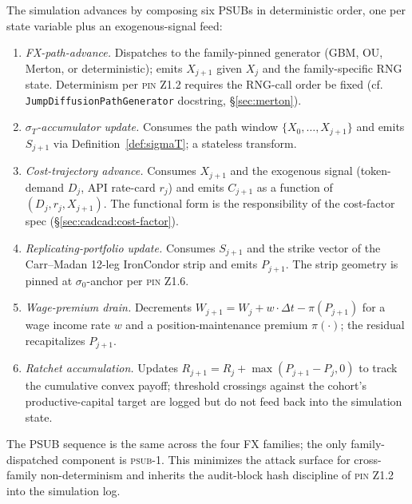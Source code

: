 \documentclass[11pt,letterpaper]{article}
\newcommand{\sigmaT}{\sigma_{T}}
\newcommand{\PinZ}[1]{\textsc{pin Z1.#1}}
\begin{document}
The simulation advances by composing six PSUBs in deterministic order,
one per state variable plus an exogenous-signal feed:

\begin{enumerate}
    \item[(\textsc{psub-1})] \emph{FX-path-advance.} Dispatches to the
        family-pinned generator (GBM, OU, Merton, or deterministic);
        emits $X_{j+1}$ given $X_{j}$ and the family-specific RNG state.
        Determinism per \PinZ{2} requires the RNG-call order be fixed
        (cf. \texttt{JumpDiffusionPathGenerator} docstring, \S\ref{sec:merton}).
    \item[(\textsc{psub-2})] \emph{$\sigmaT$-accumulator update.}
        Consumes the path window $\{X_{0}, \dots, X_{j+1}\}$ and emits
        $S_{j+1}$ via Definition~\ref{def:sigmaT}; a stateless transform.
    \item[(\textsc{psub-3})] \emph{Cost-trajectory advance.} Consumes
        $X_{j+1}$ and the exogenous signal (token-demand $D_{j}$, API
        rate-card $r_{j}$) and emits $C_{j+1}$ as a function of
        $(D_{j}, r_{j}, X_{j+1})$. The functional form is the
        responsibility of the cost-factor spec (\S\ref{sec:cadcad:cost-factor}).
    \item[(\textsc{psub-4})] \emph{Replicating-portfolio update.}
        Consumes $S_{j+1}$ and the strike vector of the Carr--Madan
        12-leg IronCondor strip and emits $P_{j+1}$. The strip
        geometry is pinned at $\sigma_{0}$-anchor per \PinZ{6}.
    \item[(\textsc{psub-5})] \emph{Wage-premium drain.} Decrements
        $W_{j+1} = W_{j} + w \cdot \Delta t - \pi(P_{j+1})$ for a wage
        income rate $w$ and a position-maintenance premium $\pi(\cdot)$;
        the residual recapitalizes $P_{j+1}$.
    \item[(\textsc{psub-6})] \emph{Ratchet accumulation.} Updates
        $R_{j+1} = R_{j} + \max(P_{j+1} - P_{j}, 0)$ to track the
        cumulative convex payoff; threshold crossings against the
        cohort's productive-capital target are logged but do not
        feed back into the simulation state.
\end{enumerate}

The PSUB sequence is the same across the four FX families; the only
family-dispatched component is \textsc{psub-1}. This minimizes the
attack surface for cross-family non-determinism and inherits the
audit-block hash discipline of \PinZ{2} into the simulation log.
\end{document}
